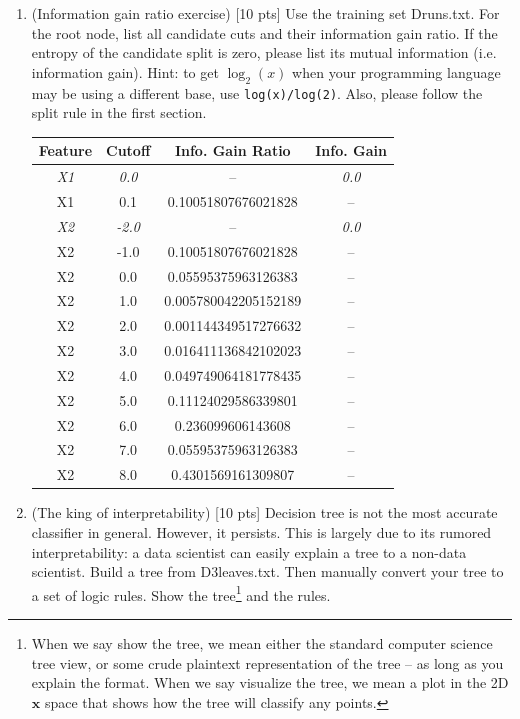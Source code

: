 \documentclass[a4paper]{article}
\theoremstyle{definition}
\def\x{\mathbf x}
\newenvironment{soln}{
    \leavevmode\color{blue}\ignorespaces
}{}
\begin{document}
\begin{enumerate}
\item (Information gain ratio exercise)  [10 pts] Use the training set Druns.txt.  For the root node, list all candidate cuts and their information gain ratio. If the entropy of the candidate split is zero, please list its mutual information (i.e. information gain). Hint: to get $\log_2(x)$ when your programming language may be using a different base, use \verb|log(x)/log(2)|. Also, please follow the split rule in the first section. \\
\begin{soln}
    \begin{tabular}{|c|c|c|c|}
        \hline
        \textbf{Feature} & \textbf{Cutoff} & \textbf{Info. Gain Ratio} & \textbf{Info. Gain} \\
        \hline
        \textit{X1} & \textit{0.0} & -- & \textit{0.0} \\
        X1 & 0.1 & 0.10051807676021828 & -- \\
        \hline
        \textit{X2} & \textit{-2.0} & -- & \textit{0.0} \\
        X2 & -1.0 & 0.10051807676021828 & -- \\
        X2 & 0.0 & 0.05595375963126383 & -- \\
        X2 & 1.0 & 0.005780042205152189 & -- \\
        X2 & 2.0 & 0.001144349517276632 & -- \\
        X2 & 3.0 & 0.016411136842102023 & -- \\
        X2 & 4.0 & 0.049749064181778435 & -- \\
        X2 & 5.0 & 0.11124029586339801 & -- \\
        X2 & 6.0 & 0.236099606143608 & -- \\
        X2 & 7.0 & 0.05595375963126383 & -- \\
        X2 & 8.0 & 0.4301569161309807 & -- \\
        \hline
    \end{tabular}
\end{soln}

\item (The king of interpretability)  [10 pts] Decision tree is not the most accurate classifier in general.  However, it persists.  This is largely due to its rumored interpretability: a data scientist can easily explain a tree to a non-data scientist.  Build a tree from D3leaves.txt.  Then manually convert your tree to a set of logic rules.  Show the tree\footnote{When we say show the tree, we mean either the standard computer science tree view, or some crude plaintext representation of the tree -- as long as you explain the format.  When we say visualize the tree, we mean a plot in the 2D $\x$ space that shows how the tree will classify any points.} and the rules. \\


\end{enumerate}
\end{document}
